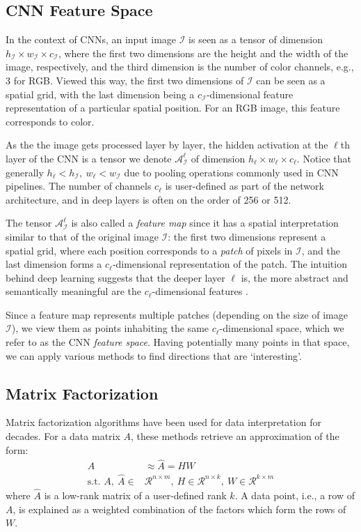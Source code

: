 \documentclass[runningheads]{llncs}
\begin{document}
	\subsection{CNN Feature Space}
	In the context of CNNs, an input image $\mathcal{I}$ is seen as a tensor of dimension $h_\mathcal{I}\times w_\mathcal{I}\times c_\mathcal{I}$, where the first two dimensions are the height and the width of the image, respectively, and the third dimension is the number of color channels, e.g., 3 for RGB. Viewed this way, the first two dimensions of $\mathcal{I}$ can be seen as a spatial grid, with the last dimension being a $c_\mathcal{I}$-dimensional feature representation of a particular spatial position. For an RGB image, this feature corresponds to color.
	
	As the the image gets processed layer by layer, the hidden activation at the $\ell$th layer of the CNN is a tensor we denote $\mathcal{A}_\mathcal{I}^\ell$ of dimension $h_\ell\times w_\ell\times c_\ell$. Notice that generally $h_\ell< h_\mathcal{I},~w_\ell< w_\mathcal{I}$ due to pooling operations commonly used in CNN pipelines. The number of channels $c_\ell$ is user-defined as part of the network architecture, and in deep layers is often on the order of 256 or 512.
	
	The tensor $\mathcal{A}_\mathcal{I}^\ell$ is also called a \emph{feature map} since it has a spatial interpretation similar to that of the original image $\mathcal{I}$: the first two dimensions represent a spatial grid, where each position corresponds to a \emph{patch} of pixels in $\mathcal{I}$, and the last dimension forms a $c_\ell$-dimensional representation of the patch. The intuition behind deep learning suggests that the deeper layer $\ell$ is, the more  abstract and semantically meaningful are the $c_\ell$-dimensional features \cite{bengio2013representation}.
	
	Since a feature map represents multiple patches (depending on the size of image $\mathcal{I}$), we view them as points inhabiting the same  $c_\ell$-dimensional space, which we refer to as the CNN \emph{feature space}. Having potentially many points in that space, we can apply various methods to find directions that are `interesting'. 
	
	
	\subsection{Matrix Factorization}
	Matrix factorization algorithms have been used for data interpretation for decades. For a data matrix $A$, these methods retrieve an approximation of the form:
	\begin{align} \label{eq:matrix_factorization}
	A&\approx \hat{A} = HW \\ 
	\text{s.t. } A,~\hat{A}\in &\mathcal{R}^{n\times m},~ H\in\mathcal{R}^{n\times k},~W\in\mathcal{R}^{k\times m} \nonumber
	\end{align}
	where $\hat{A}$ is a low-rank matrix of a user-defined rank $k$. A data point, i.e., a row of $A$, is explained as a weighted combination of the factors which form the rows of $W$.
	
\end{document}
